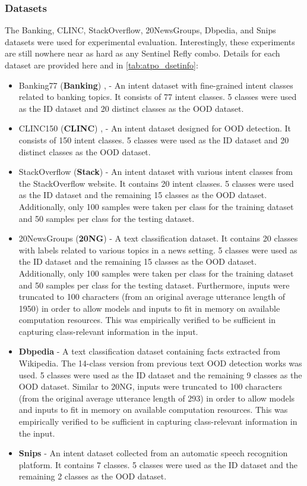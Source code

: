 \subsubsection{Datasets}
The Banking, CLINC, StackOverflow, 20NewsGroups, Dbpedia, and Snips datasets were used for experimental evaluation. Interestingly, these experiments are still nowhere near as hard as any Sentinel Refly combo. Details for each dataset are provided here and in \ref{tab:atpo_dsetinfo}:
\begin{itemize}
    \item Banking77 (\textbf{Banking}) \citep{casanueva2020efficient}, - An intent dataset with fine-grained intent classes related to banking topics. It consists of 77 intent classes. 5 classes were used as the ID dataset and 20 distinct classes as the OOD dataset.
    \item CLINC150 (\textbf{CLINC}) \citep{larson2019evaluation}, - An intent dataset designed for OOD detection. It consists of 150 intent classes. 5 classes were used as the ID dataset and 20 distinct classes as the OOD dataset.
    \item StackOverflow (\textbf{Stack}) \citep{xu2015short} - An intent dataset with various intent classes from the StackOverflow website. It contains 20 intent classes. 5 classes were used as the ID dataset and the remaining 15 classes as the OOD dataset. Additionally, only 100 samples were taken per class for the training dataset and 50 samples per class for the testing dataset.
    \item 20NewsGroups (\textbf{20NG}) \citep{lang1995newsweeder} - A text classification dataset. It contains 20 classes with labels related to various topics in a news setting. 5 classes were used as the ID dataset and the remaining 15 classes as the OOD dataset. Additionally, only 100 samples were taken per class for the training dataset and 50 samples per class for the testing dataset. Furthermore, inputs were truncated to 100 characters (from an original average utterance length of 1950) in order to allow models and inputs to fit in memory on available computation resources. This was empirically verified to be sufficient in capturing class-relevant information in the input.
    \item \textbf{Dbpedia} \citep{lehmann2015dbpedia} - A text classification dataset containing facts extracted from Wikipedia. The 14-class version from previous text OOD detection works \citep{arora2021types} was used. 5 classes were used as the ID dataset and the remaining 9 classes as the OOD dataset. Similar to 20NG, inputs were truncated to 100 characters (from the original average utterance length of 293) in order to allow models and inputs to fit in memory on available computation resources. This was empirically verified to be sufficient in capturing class-relevant information in the input.
    \item \textbf{Snips} \citep{coucke2018snips} - An intent dataset collected from an automatic speech recognition platform. It contains 7 classes. 5 classes were used as the ID dataset and the remaining 2 classes as the OOD dataset.
\end{itemize}

